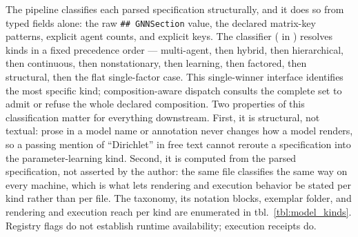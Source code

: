 \documentclass[
  english,
  9pt,
]{extarticle}
\begin{document}
The pipeline classifies each parsed specification structurally, and it
does so from typed fields alone: the raw \texttt{\#\#\ GNNSection}
value, the declared matrix-key patterns, explicit agent counts, and
explicit  keys. The classifier
( in
) resolves kinds in a fixed
precedence order --- multi-agent, then hybrid, then hierarchical, then
continuous, then nonstationary, then learning, then factored, then
structural, then the flat single-factor case. This single-winner
interface identifies the most specific kind; composition-aware dispatch
consults the complete  set to admit or
refuse the whole declared composition. Two properties of this
classification matter for everything downstream. First, it is
structural, not textual: prose in a model name or annotation never
changes how a model renders, so a passing mention of ``Dirichlet'' in
free text cannot reroute a specification into the parameter-learning
kind. Second, it is computed from the parsed specification, not asserted
by the author: the same file classifies the same way on every machine,
which is what lets rendering and execution behavior be stated per kind
rather than per file. The taxonomy, its notation blocks, exemplar
folder, and rendering and execution reach per kind are enumerated in
tbl.~\ref{tbl:model_kinds}. Registry flags do not establish runtime
availability; execution receipts do.
\end{document}
